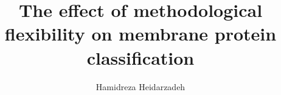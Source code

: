 \author{Hamidreza Heidarzadeh}
\title{The effect of methodological flexibility on membrane protein classification}

